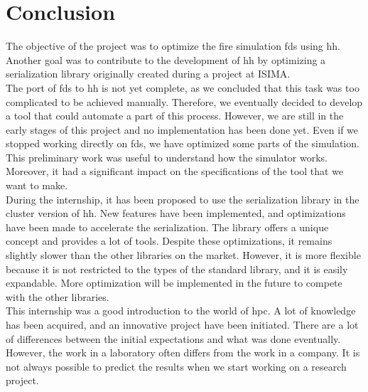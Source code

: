
\newpage
\section*{Conclusion}

The objective of the project was to optimize the fire simulation \gls{fds} using
\gls{hh}. Another goal was to contribute to the development of \gls{hh} by
optimizing a serialization library originally created during a project at
ISIMA.\\

The port of \gls{fds} to \gls{hh} is not yet complete, as we concluded that this
task was too complicated to be achieved manually. Therefore, we eventually
decided to develop a tool that could automate a part of this process. However,
we are still in the early stages of this project and no implementation has been
done yet. Even if we stopped working directly on \gls{fds}, we have optimized
some parts of the simulation. This preliminary work was useful to understand how
the simulator works. Moreover, it had a significant impact on the specifications
of the tool that we want to make.\\

During the internship, it has been proposed to use the serialization library in
the cluster version of \gls{hh}. New features have been implemented, and
optimizations have been made to accelerate the serialization. The library offers
a unique concept and provides a lot of tools. Despite these optimizations, it
remains slightly slower than the other libraries on the market. However, it is
more flexible because it is not restricted to the types of the standard library,
and it is easily expandable. More optimization will be implemented in the future
to compete with the other libraries.\\

This internship was a good introduction to the world of \gls{hpc}. A lot of
knowledge has been acquired, and an innovative project have been initiated.
There are a lot of differences between the initial expectations and what was
done eventually. However, the work in a laboratory often differs from the work
in a company. It is not always possible to predict the results when we start
working on a research project.

\label{lastPage}
\newpage
\pagestyle{empty}
